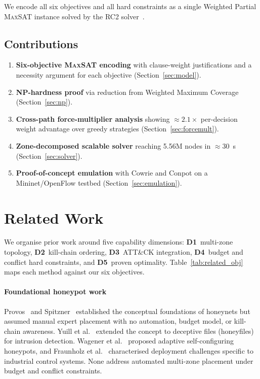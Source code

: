 \documentclass[journal]{IEEEtran}
\newcommand{\MAXSAT}{\textsc{MaxSAT}}
\begin{document}
We encode all six objectives and all hard constraints as a single
Weighted Partial \MAXSAT{} instance solved by the RC2
solver~\cite{rc2}.

\subsection{Contributions}
\begin{enumerate}
  \item \textbf{Six-objective \MAXSAT{} encoding} with clause-weight
    justifications and a necessity argument for each objective
    (Section~\ref{sec:model}).
  \item \textbf{NP-hardness proof} via reduction from Weighted Maximum
    Coverage~\cite{feige1998} (Section~\ref{sec:np}).
  \item \textbf{Cross-path force-multiplier analysis} showing
    ${\approx}2.1\times$ per-decision weight advantage over greedy
    strategies (Section~\ref{sec:forcemult}).
  \item \textbf{Zone-decomposed scalable solver} reaching 5.56M nodes
    in ${\approx}30$~s (Section~\ref{sec:solver}).
  \item \textbf{Proof-of-concept emulation} with Cowrie and Conpot on
    a Mininet/OpenFlow testbed (Section~\ref{sec:emulation}).
\end{enumerate}

\section{Related Work}
\label{sec:related}

We organise prior work around five capability dimensions:
\textbf{D1}~multi-zone topology, \textbf{D2}~kill-chain ordering,
\textbf{D3}~ATT\&CK integration, \textbf{D4}~budget and conflict hard
constraints, and \textbf{D5}~proven optimality.
Table~\ref{tab:related_obj} maps each method against our six objectives.

\paragraph{Foundational honeypot work}
Provos~\cite{provos2004} and Spitzner~\cite{spitzner2003} established
the conceptual foundations of honeynets but assumed manual expert
placement with no automation, budget model, or kill-chain awareness.
Yuill et al.~\cite{yuill2004} extended the concept to deceptive files
(honeyfiles) for intrusion detection. Wagener et
al.~\cite{wagener2009} proposed adaptive self-configuring honeypots,
and Fraunholz et al.~\cite{fraunholz2017} characterised deployment
challenges specific to industrial control systems. None address
automated multi-zone placement under budget and conflict constraints.
\end{document}
